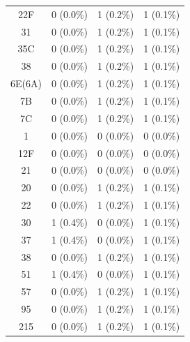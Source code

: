 \documentclass{article}
\begin{document}
\begin{table}[hbt!]
{\begin{tabular}{cccc}
22F                                       & 0 (0.0\%)       & 1 (0.2\%)          & 1 (0.1\%)       \\
31                                        & 0 (0.0\%)       & 1 (0.2\%)          & 1 (0.1\%)       \\
35C                                       & 0 (0.0\%)       & 1 (0.2\%)          & 1 (0.1\%)       \\
38                                        & 0 (0.0\%)       & 1 (0.2\%)          & 1 (0.1\%)       \\
6E(6A)                                    & 0 (0.0\%)       & 1 (0.2\%)          & 1 (0.1\%)       \\
7B                                        & 0 (0.0\%)       & 1 (0.2\%)          & 1 (0.1\%)       \\
7C                                        & 0 (0.0\%)       & 1 (0.2\%)          & 1 (0.1\%)       \\
1                                         & 0 (0.0\%)       & 0 (0.0\%)          & 0 (0.0\%)       \\
12F                                       & 0 (0.0\%)       & 0 (0.0\%)          & 0 (0.0\%)       \\
21                                        & 0 (0.0\%)       & 0 (0.0\%)          & 0 (0.0\%)       \\
20                                        & 0 (0.0\%)       & 1 (0.2\%)          & 1 (0.1\%)       \\
22                                        & 0 (0.0\%)       & 1 (0.2\%)          & 1 (0.1\%)       \\
30                                        & 1 (0.4\%)       & 0 (0.0\%)          & 1 (0.1\%)       \\
37                                        & 1 (0.4\%)       & 0 (0.0\%)          & 1 (0.1\%)       \\
38                                        & 0 (0.0\%)       & 1 (0.2\%)          & 1 (0.1\%)       \\
51                                        & 1 (0.4\%)       & 0 (0.0\%)          & 1 (0.1\%)       \\
57                                        & 0 (0.0\%)       & 1 (0.2\%)          & 1 (0.1\%)       \\
95                                        & 0 (0.0\%)       & 1 (0.2\%)          & 1 (0.1\%)       \\
215                                       & 0 (0.0\%)       & 1 (0.2\%)          & 1 (0.1\%)       \\

\end{tabular}}
\end{table}
\end{document}
